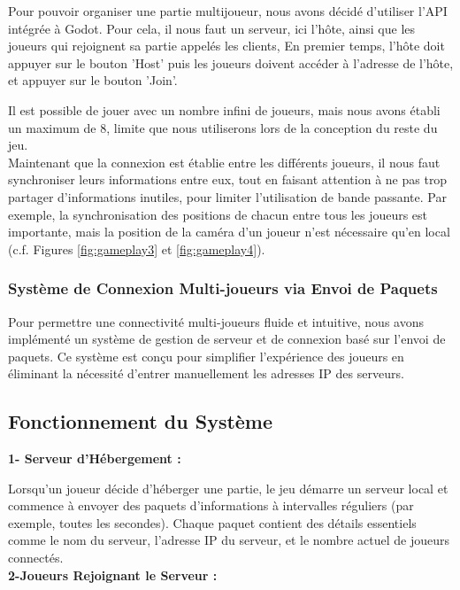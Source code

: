       Pour pouvoir organiser une partie multijoueur, nous avons décidé d'utiliser l'API intégrée à Godot.
      Pour cela, il nous faut un serveur, ici l'hôte, ainsi que les joueurs qui rejoignent sa partie appelés les clients,
      En premier temps, l'hôte doit appuyer sur le bouton 'Host' puis les joueurs doivent accéder à l'adresse de l'hôte, et appuyer sur le bouton 'Join'.

      Il est possible de jouer avec un nombre infini de joueurs, mais nous avons établi un maximum de 8, limite que nous utiliserons lors de la conception du reste du jeu.
      \\

      Maintenant que la connexion est établie entre les différents joueurs, il nous faut synchroniser leurs informations entre eux, 
      tout en faisant attention à ne pas trop partager d'informations inutiles, pour limiter l'utilisation de bande passante.
      Par exemple, la synchronisation des positions de chacun entre tous les joueurs est importante, 
      mais la position de la caméra d'un joueur n'est nécessaire qu'en local (c.f. Figures \ref*{fig:gameplay3} et \ref*{fig:gameplay4}).


      \subsubsection*{Système de Connexion Multi-joueurs via Envoi de Paquets}
      Pour permettre une connectivité multi-joueurs fluide et intuitive, nous avons implémenté un système de gestion de serveur 
      et de connexion basé sur l'envoi de paquets. Ce système est conçu pour simplifier l'expérience des joueurs en éliminant 
      la nécessité d'entrer manuellement les adresses IP des serveurs.

      \subsection*{Fonctionnement du Système}
      \textbf{1- Serveur d'Hébergement :}

      Lorsqu'un joueur décide d'héberger une partie, le jeu démarre un serveur local et commence à envoyer des paquets d'informations à intervalles réguliers 
      (par exemple, toutes les secondes).
      Chaque paquet contient des détails essentiels comme le nom du serveur, l'adresse IP du serveur, et le nombre actuel de joueurs connectés.
      \\

      \textbf{2-Joueurs Rejoignant le Serveur :}


